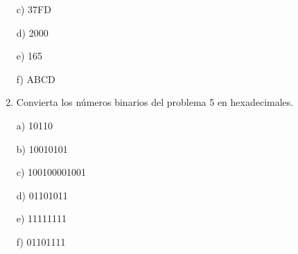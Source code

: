 \documentclass[a4paper, 12pt]{article}
\newcommand{\Aspace}{0.2cm}
\begin{document}
\begin{enumerate}
            \vspace{\Aspace} \par
            c) 37FD
            \\ { \color{azul}  }

            \vspace{\Aspace} \par
            d) 2000
            \\ { \color{azul}  }

            \vspace{\Aspace} \par
            e) 165
            \\ { \color{azul}  }

            \vspace{\Aspace} \par
            f) ABCD
            \\ { \color{azul}  }


        \item Convierta los números binarios del problema 5 en hexadecimales.
            \vspace{\Aspace} \par
            a) 10110
            \\ { \color{azul}  }

            \vspace{\Aspace} \par
            b) 10010101
            \\ { \color{azul}  }

            \vspace{\Aspace} \par
            c) 100100001001
            \\ { \color{azul}  }

            \vspace{\Aspace} \par
            d) 01101011
            \\ { \color{azul}  }

            \vspace{\Aspace} \par
            e) 11111111
            \\ { \color{azul}  }

            \vspace{\Aspace} \par
            f) 01101111
            \\ { \color{azul}  }



\end{enumerate}
\end{document}
